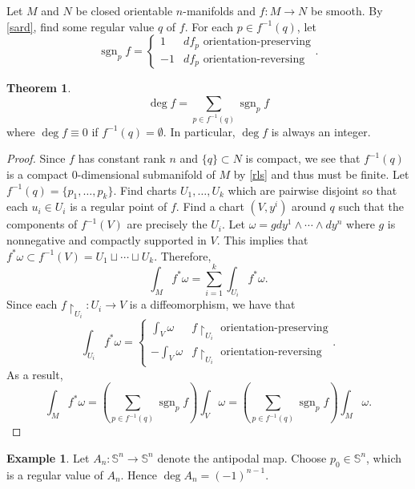 \documentclass[10pt,letterpaper,cm]{nupset}
\theoremstyle{definition}
\newtheorem{exmp}[definition]{Example}
\theoremstyle{theorem}
\newtheorem{theorem}[definition]{Theorem}
\theoremstyle{remark}
\renewcommand{\S}{\mathbb S}
\newcommand{\1}{\mathbf{1}}
\newcommand{\0}{\vec 0}
\DeclareMathOperator{\sgn}{sgn}
\begin{document}
Let $M$ and $N$ be closed orientable $n$-manifolds and $f: M \to N$ be smooth. By \cref{sard}, find some regular value $q$ of $f$. For each $p\in f^{-1}(q)$, let 
$$ \sgn_pf = \begin{cases}
1 & df_p \text{ orientation-preserving} 
\\ {-1}  & df_p \text{ orientation-reversing} \end{cases}.$$ 

\begin{theorem}
$$\deg f = \sum_{p\in f^{-1}(q)} \sgn_pf$$ where $\deg f \equiv 0$ if $f^{-1}(q) = \emptyset$.
In particular, $\deg f$ is always an integer. 
\end{theorem}
\begin{proof}
Since $f$ has constant rank $n$ and $\{q\}\subset N$ is compact, we see that $f^{-1}(q)$ is a compact $0$-dimensional submanifold  of $M$ by \cref{rls}  and thus must be finite. Let $f^{-1}(q) = \{p_1, \ldots, p_k\}$. Find  charts $U_1, \ldots, U_k$ which are pairwise disjoint so that each $u_i \in U_i$ is a regular point of $f$. Find a chart $(V, y^i)$ around $q$ such that the components of $f^{-1}(V)$ are precisely the $U_i$. Let $\omega = gdy^1 \wedge \cdots \wedge dy^n$ where $g$ is nonnegative and compactly supported in $V$. This implies that $f^{\ast}\omega \subset f^{-1}(V) =U_1 \sqcup \cdots \sqcup U_k$. Therefore, $$  \int_Mf^{\ast}\omega =\sum_{i=1}^k\int_{U_i}f^{\ast}\omega .$$ Since each $f\restriction_{U_i} : U_i \to V$ is a diffeomorphism, we have that $$ \int_{U_i}f^{\ast}\omega =
\begin{cases}
\int_{V} \omega & f\restriction_{U_i}  \text{ orientation-preserving} 
\\ {-\int_V\omega}  & f\restriction_{U_i} \text{ orientation-reversing}
\end{cases} .$$ As a result, $$\int_M f^{\ast} \omega  =\left(\sum_{p\in f^{-1}(q)} \sgn_pf \right)\int_V \omega =\left(\sum_{p\in f^{-1}(q)} \sgn_pf \right)\int_M \omega .$$
\end{proof}

\begin{exmp}
Let $A_n: \S^n \to \S^n$ denote the antipodal map. Choose $p_0 \in \S^n$, which is a regular value of $A_n$. Hence $\deg A_n = ({-1})^{n-1}$.
\end{exmp}
\end{document}
